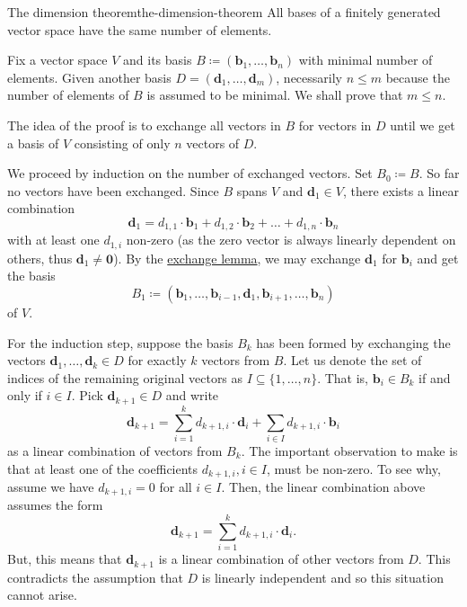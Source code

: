 \begin{theorem}{The dimension theorem}{the-dimension-theorem}
 All bases of a finitely generated vector space have the same number of elements.
\end{theorem}
\begin{thmproof}
 Fix a vector space $V$ and its basis $B \coloneqq
 (\mathbf{b}_1,\ldots,\mathbf{b}_n)$ with minimal number of elements. Given
 another basis $D = (\mathbf{d}_1,\ldots,\mathbf{d}_m)$, necessarily $n \leq m$
 because the number of elements of $B$ is assumed to be minimal. We shall prove
 that $m \leq n$.

 The idea of the proof is to exchange all vectors in $B$ for vectors in $D$
 until we get a basis of $V$ consisting of only $n$ vectors of $D$.

 We proceed by induction on the number of exchanged vectors. Set $B_0 \coloneqq
 B$. So far no vectors have been exchanged. Since $B$ spans $V$ and
 $\mathbf{d}_1 \in V$, there exists a linear combination
 \[
  \mathbf{d}_1 = d_{1,1} \cdot \mathbf{b}_1 + d_{1,2} \cdot \mathbf{b}_2 +
  \ldots + d_{1,n} \cdot \mathbf{b}_n
 \]
 with at least one $d_{1,i}$ non-zero (as the zero vector is always linearly
 dependent on others, thus $\mathbf{d}_1 \neq \mathbf{0}$). By the
 \hyperref[lem:exchange-lemma]{exchange lemma}, we may exchange $\mathbf{d}_1$
 for $\mathbf{b}_i$ and get the basis
 \[
  B_1 \coloneqq
  (\mathbf{b}_1,\ldots,\mathbf{b}_{i-1},\mathbf{d}_1,\mathbf{b}_{i+1}, \ldots,
  \mathbf{b}_n)
 \]
 of $V$.

 For the induction step, suppose the basis $B_k$ has been formed by exchanging
 the vectors $\mathbf{d}_1,\ldots,\mathbf{d}_k \in D$ for exactly $k$ vectors
 from $B$. Let us denote the set of indices of the remaining original vectors as
 $I \subseteq \{1,\ldots,n\}$. That is, $\mathbf{b}_i \in B_k$ if and only if $i
 \in I$. Pick $\mathbf{d}_{k+1} \in D$ and write
 \[
  \mathbf{d}_{k+1} = \sum_{i=1}^{k} d_{k+1,i} \cdot \mathbf{d}_i + \sum_{i \in
  I} d_{k+1,i} \cdot \mathbf{b}_i
 \]
 as a linear combination of vectors from $B_k$. The important observation to
 make is that at least one of the coefficients $d_{k+1,i}, i \in I$, must be
 non-zero. To see why, assume we have $d_{k+1,i} = 0$ for all $i \in I$. Then,
 the linear combination above assumes the form
 \[
  \mathbf{d}_{k+1} = \sum_{i=1}^{k} d_{k+1,i} \cdot \mathbf{d}_i.
 \]
 But, this means that $\mathbf{d}_{k+1}$ is a linear combination of other
 vectors from $D$. This contradicts the assumption that $D$ is linearly
 independent and so this situation cannot arise.


\end{thmproof}

